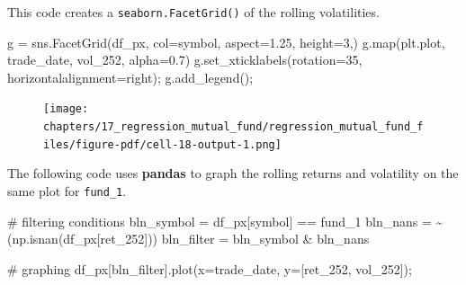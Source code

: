 \documentclass[
  letterpaper,
  DIV=11,
  numbers=noendperiod]{scrreprt}
\newenvironment{Shaded}{\begin{snugshade}}{\end{snugshade}}
\newcommand{\BuiltInTok}[1]{\textcolor[rgb]{0.00,0.23,0.31}{#1}}
\newcommand{\CommentTok}[1]{\textcolor[rgb]{0.37,0.37,0.37}{#1}}
\newcommand{\DecValTok}[1]{\textcolor[rgb]{0.68,0.00,0.00}{#1}}
\newcommand{\FloatTok}[1]{\textcolor[rgb]{0.68,0.00,0.00}{#1}}
\newcommand{\NormalTok}[1]{\textcolor[rgb]{0.00,0.23,0.31}{#1}}
\newcommand{\OperatorTok}[1]{\textcolor[rgb]{0.37,0.37,0.37}{#1}}
\newcommand{\StringTok}[1]{\textcolor[rgb]{0.13,0.47,0.30}{#1}}
\begin{document}
This code creates a \texttt{seaborn.FacetGrid()} of the rolling
volatilities.

\begin{Shaded}
\begin{Highlighting}[]
\NormalTok{g }\OperatorTok{=}\NormalTok{ sns.FacetGrid(df\_px, col}\OperatorTok{=}\StringTok{\textquotesingle{}symbol\textquotesingle{}}\NormalTok{, aspect}\OperatorTok{=}\FloatTok{1.25}\NormalTok{, height}\OperatorTok{=}\DecValTok{3}\NormalTok{,)}
\NormalTok{g.}\BuiltInTok{map}\NormalTok{(plt.plot, }\StringTok{\textquotesingle{}trade\_date\textquotesingle{}}\NormalTok{, }\StringTok{\textquotesingle{}vol\_252\textquotesingle{}}\NormalTok{, alpha}\OperatorTok{=}\FloatTok{0.7}\NormalTok{)}
\NormalTok{g.set\_xticklabels(rotation}\OperatorTok{=}\DecValTok{35}\NormalTok{, horizontalalignment}\OperatorTok{=}\StringTok{\textquotesingle{}right\textquotesingle{}}\NormalTok{)}\OperatorTok{;}
\NormalTok{g.add\_legend()}\OperatorTok{;}
\end{Highlighting}
\end{Shaded}

\begin{figure}[H]

{\centering \texttt{[image: chapters/17\_regression\_mutual\_fund/regression\_mutual\_fund\_files/figure-pdf/cell-18-output-1.png]}

}

\end{figure}

The following code uses \textbf{pandas} to graph the rolling returns and
volatility on the same plot for \texttt{fund\_1}.

\begin{Shaded}
\begin{Highlighting}[]
\CommentTok{\# filtering conditions}
\NormalTok{bln\_symbol }\OperatorTok{=}\NormalTok{ df\_px[}\StringTok{\textquotesingle{}symbol\textquotesingle{}}\NormalTok{] }\OperatorTok{==} \StringTok{\textquotesingle{}fund\_1\textquotesingle{}}
\NormalTok{bln\_nans }\OperatorTok{=} \OperatorTok{\textasciitilde{}}\NormalTok{(np.isnan(df\_px[}\StringTok{\textquotesingle{}ret\_252\textquotesingle{}}\NormalTok{]))}
\NormalTok{bln\_filter }\OperatorTok{=}\NormalTok{ bln\_symbol }\OperatorTok{\&}\NormalTok{ bln\_nans}

\CommentTok{\# graphing}
\NormalTok{df\_px[bln\_filter].plot(x}\OperatorTok{=}\StringTok{\textquotesingle{}trade\_date\textquotesingle{}}\NormalTok{, y}\OperatorTok{=}\NormalTok{[}\StringTok{\textquotesingle{}ret\_252\textquotesingle{}}\NormalTok{, }\StringTok{\textquotesingle{}vol\_252\textquotesingle{}}\NormalTok{])}\OperatorTok{;}
\end{Highlighting}
\end{Shaded}
\end{document}
